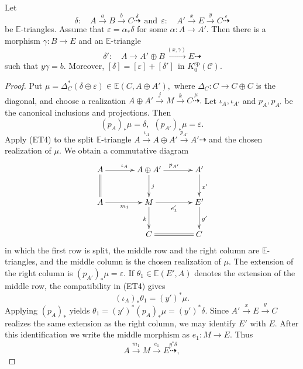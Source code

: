 \documentclass[11pt, twoside]{article}
\def\C{\mathcal{C}}
\def\E{\mathbb{E}}
\numberwithin{equation}{section}
\begin{document}
\begin{lemma}\label{lem:comparison-triangle}
Let
\[
 \delta:\quad A\xrightarrow{a}B\xrightarrow{b}C
 \overset{\delta}{\dashrightarrow}
~~\mbox{and}~~
 \varepsilon:\quad A'\xrightarrow{x}E\xrightarrow{y}C
 \overset{\varepsilon}{\dashrightarrow}
\]
be $\E$-triangles.  Assume that $\varepsilon=\alpha_*\delta$ for some
$\alpha\colon A\to A'$.  Then there is a morphism
$\gamma\colon B\to E$ and an $\E$-triangle
\[
 \delta':\quad
 A\longrightarrow A'\oplus B
 \xrightarrow{(x,\gamma)}E\dashrightarrow
\]
such that $y\gamma=b$.  Moreover,
$
 [\delta]=[\varepsilon]+[\delta']
 ~~\text{in }K_0^{\mathrm{sp}}(\C).
$
\end{lemma}

\begin{proof}
Put
$
 \mu=\Delta_C^*(\delta\oplus\varepsilon)
 \in\E(C,A\oplus A'),
$
where $\Delta_C\colon C\to C\oplus C$ is the diagonal, and choose a
realization
$
 A\oplus A'\xrightarrow{j}M\xrightarrow{k}C
 \overset{\mu}{\dashrightarrow}.
$
Let $\iota_A,\iota_{A'}$ and $p_A,p_{A'}$ be the canonical inclusions and
projections.  Then
\[
 (p_A)_*\mu=\delta,
 ~~
 (p_{A'})_*\mu=\varepsilon.
\]
Apply (ET4) to the split $\E$-triangle
$A\xrightarrow{\iota_A}A\oplus A'\xrightarrow{p_{A'}}A'\dashrightarrow$
and the chosen realization of $\mu$.  We obtain a commutative diagram
\begin{equation}\label{diag:comparison-one}
\begin{array}{l}
\xymatrix@C=3.5em@R=2.6em{
 A \ar[r]^{\iota_A}\ar@{=}[d] &
 A\oplus A' \ar[r]^{p_{A'}}\ar[d]^{j} &
 A' \ar[d]^{x'} \\
 A \ar[r]_{m_1} &
 M \ar[r]_{e_1'}\ar[d]_{k} &
 E' \ar[d]^{y'} \\
 & C \ar@{=}[r] & C
}
\end{array}
\end{equation}
in which the first row is split, the middle row and the right column are
$\E$-triangles, and the middle column is the chosen realization of $\mu$.
The extension of the right column is $(p_{A'})_*\mu=\varepsilon$.
If $\theta_1\in\E(E',A)$ denotes the extension of the middle row, the
compatibility in (ET4) gives
\[
 (\iota_A)_*\theta_1=(y')^*\mu.
\]
Applying $(p_A)_*$ yields
$
 \theta_1=(y')^*(p_A)_*\mu=(y')^*\delta.
$
Since $A'\xrightarrow{x}E\xrightarrow{y}C$ realizes the same extension as
the right column, we may identify $E'$ with $E$.  After this identification
we write the middle morphism as $e_1\colon M\to E$.  Thus
\[
 A\xrightarrow{m_1}M\xrightarrow{e_1}E
 \overset{y^*\delta}{\dashrightarrow},
\]
\end{proof}
\end{document}
